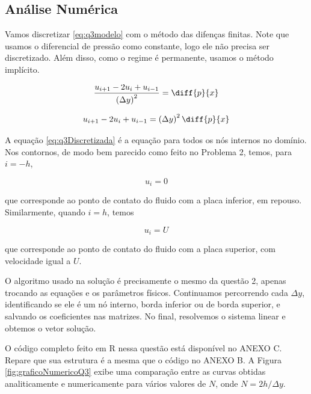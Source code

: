 \subsection{Análise Numérica}

Vamos discretizar \eqref{eq:q3modelo} com o método das difenças finitas. Note que
usamos o diferencial de pressão como constante, logo ele não precisa ser discretizado.
Além disso, como o regime é permanente, usamos o método implícito.

\[ \frac{u_{i+1} - 2u_i + u_{i-1}}{\left(\Delta y\right)^2} = \diff{p}{x} \]

\begin{equation}\label{eq:q3Discretizada}
    u_{i+1} - 2u_i + u_{i-1} = \left(\Delta y\right)^2\diff{p}{x}
\end{equation}

A equação \eqref{eq:q3Discretizada} é a equação para todos os nós internos no domínio. Nos contornos,
de modo bem parecido como feito no Problema 2, temos, para $i = -h$,

\begin{equation}\label{eq:q3DiscContorno0}
    u_i = 0
\end{equation}

\noindent que corresponde ao ponto de contato do fluido com a placa inferior, em repouso.
Similarmente, quando $i = h$, temos 

\begin{equation}\label{eq:q3DiscContornoU}
    u_i = U
\end{equation}

\noindent que corresponde ao ponto de contato do fluido com a placa superior, com velocidade
igual a $U$.

O algoritmo usado na solução é precisamente o mesmo da questão 2, apenas trocando as equações e os parâmetros físicos.
Continuamos percorrendo cada $\Delta y$, identificando se ele é um nó interno, borda inferior ou
de borda superior, e salvando os coeficientes nas matrizes. No final, resolvemos o sistema linear 
e obtemos o vetor solução.

O código completo feito em R nessa questão está disponível no ANEXO C. Repare que sua estrutura
é a mesma que o código no ANEXO B. A Figura \ref*{fig:graficoNumericoQ3} exibe uma comparação entre
as curvas obtidas analiticamente e numericamente para vários valores de $N$, onde $N = 2h / \Delta y$.

